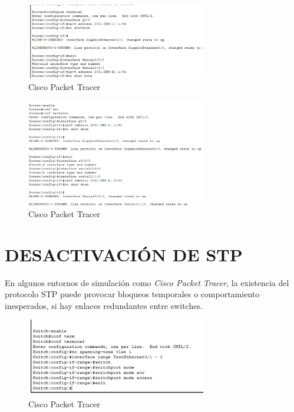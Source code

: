\documentclass[12pt]{article}
\begin{document}
	\begin{figure}[h!]
		\centering
		\includegraphics[width=0.7\textwidth]{../tpipv6-2/imagenes/confipv6r0}
		\caption{Cisco Packet Tracer}
	\end{figure}
	
	\begin{figure}[h!]
		\centering
		\includegraphics[width=0.7\textwidth]{../tpipv6-2/imagenes/confipv6r1}
		\caption{Cisco Packet Tracer}
	\end{figure}
	
	\section{DESACTIVACIÓN DE STP}
	{\large En algunos entornos de simulación como \textit{Cisco Packet Tracer}, la existencia del protocolo STP puede provocar bloqueos temporales o comportamiento inesperados, si hay enlaces redundantes entre switches.}
	
	\begin{figure}[h!]
		\centering
		\includegraphics[width=0.7\textwidth]{../tpipv6-2/imagenes/stpsw1}
		\caption{Cisco Packet Tracer}
	\end{figure}
	
\end{document}
